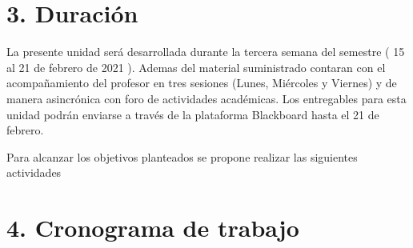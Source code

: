 \documentclass[base=hide,11pt]{elegantbook}
\begin{document}
%
%
\section*{3. Duración}
La presente  unidad será desarrollada durante la  tercera semana del semestre ( 15 al 21 de febrero de 2021 ). Ademas del material suministrado  contaran con el acompañamiento del profesor en tres sesiones (Lunes, Miércoles y Viernes) y de manera asincrónica con  foro de actividades académicas. Los entregables para esta unidad podrán enviarse a través de la plataforma Blackboard hasta el  21 de febrero.

Para alcanzar los objetivos planteados se propone realizar las siguientes actividades
% 	
\section*{4. Cronograma de trabajo}
\end{document}
